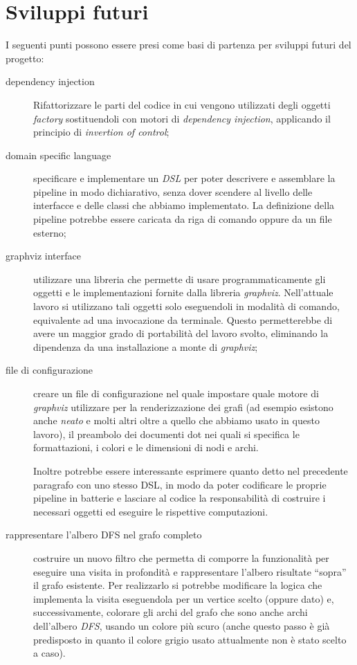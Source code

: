 \section{Sviluppi futuri}

I seguenti punti possono essere presi come basi di partenza per
sviluppi futuri del progetto:
\begin{description}
\item[dependency injection] Rifattorizzare le parti del codice in cui
  vengono utilizzati degli oggetti \emph{factory} sostituendoli con
  motori di \emph{dependency injection}, applicando il principio di
  \emph{invertion of control};
\item[domain specific language] specificare e implementare un
  \emph{DSL} per poter descrivere e assemblare la pipeline in modo
  dichiarativo, senza dover scendere al livello delle interfacce e
  delle classi che abbiamo implementato. La definizione della pipeline
  potrebbe essere caricata da riga di comando oppure da un file
  esterno;
\item[graphviz interface] utilizzare una libreria che permette di
  usare programmaticamente gli oggetti e le implementazioni fornite
  dalla libreria \emph{graphviz}. Nell'attuale lavoro si utilizzano
  tali oggetti solo eseguendoli in modalit\`a di comando, equivalente
  ad una invocazione da terminale. Questo permetterebbe di avere un
  maggior grado di portabilit\`a del lavoro svolto, eliminando la
  dipendenza da una installazione a monte di \emph{graphviz};
\item[file di configurazione] creare un file di configurazione nel
  quale impostare quale motore di \emph{graphviz} utilizzare per la
  renderizzazione dei grafi (ad esempio esistono anche \emph{neato} e
  molti altri oltre a quello che abbiamo usato in questo lavoro), il
  preambolo dei documenti dot nei quali si specifica le formattazioni,
  i colori e le dimensioni di nodi e archi.

  Inoltre potrebbe essere interessante esprimere quanto detto nel
  precedente paragrafo con uno stesso DSL, in modo da poter codificare
  le proprie pipeline in batterie e lasciare al codice la
  responsabilit\`a di costruire i necessari oggetti ed eseguire le
  rispettive computazioni.

\item[rappresentare l'albero DFS nel grafo completo] costruire un
  nuovo filtro che permetta di comporre la funzionalit\`a per eseguire
  una visita in profondit\`a e rappresentare l'albero risultate
  ``sopra'' il grafo esistente. Per realizzarlo si potrebbe modificare
  la logica che implementa la visita eseguendola per un vertice scelto
  (oppure dato) e, successivamente, colorare gli archi del grafo che
  sono anche archi dell'albero \emph{DFS}, usando un colore pi\`u
  scuro (anche questo passo \`e gi\`a predisposto in quanto il colore
  grigio usato attualmente non \`e stato scelto a caso).


\end{description}
